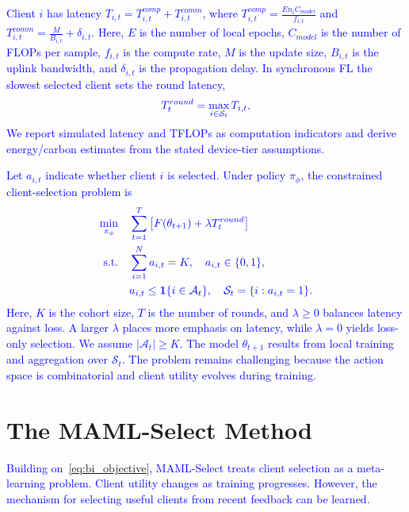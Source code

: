 \documentclass[journal]{IEEEtran}
\newcommand{\revision}[1]{\textcolor{blue}{#1}}
\begin{document}
\revision{Client $i$ has latency $T_{i,t}=T_{i,t}^{comp}+T_{i,t}^{comm}$, where $T_{i,t}^{comp} = \frac{E n_i C_{model}}{f_{i,t}}$ and $T_{i,t}^{comm} = \frac{M}{B_{i,t}} + \delta_{i,t}$. Here, $E$ is the number of local epochs, $C_{model}$ is the number of FLOPs per sample, $f_{i,t}$ is the compute rate, $M$ is the update size, $B_{i,t}$ is the uplink bandwidth, and $\delta_{i,t}$ is the propagation delay. In synchronous FL the slowest selected client sets the round latency,}
\begin{equation}
	\color{blue}
	T_t^{round} = \max_{i \in \mathcal{S}_t} T_{i,t},
	\label{eq:round_latency}
\end{equation}
\revision{We report simulated latency and TFLOPs as computation indicators and derive energy/carbon estimates from the stated device-tier assumptions.}

\revision{Let $a_{i,t}$ indicate whether client $i$ is selected. Under policy $\pi_\phi$, the constrained client-selection problem is}
\begin{equation}
	\color{blue}
	\begin{aligned}
		\min_{\pi_\phi}\quad & \sum_{t=1}^{T} \left[F(\theta_{t+1}) + \lambda T_t^{round}\right] \\
		\text{s.t.}\quad & \sum_{i=1}^{N} a_{i,t}=K,\quad a_{i,t}\in\{0,1\}, \\
		& a_{i,t}\leq \mathbf{1}\{i\in\mathcal{A}_t\},\quad
		\mathcal{S}_t=\{i:a_{i,t}=1\}.
	\end{aligned}
	\label{eq:bi_objective}
\end{equation}
\revision{Here, $K$ is the cohort size, $T$ is the number of rounds, and $\lambda \geq 0$ balances latency against loss. A larger $\lambda$ places more emphasis on latency, while $\lambda=0$ yields loss-only selection. We assume $|\mathcal{A}_t|\geq K$. The model $\theta_{t+1}$ results from local training and aggregation over $\mathcal{S}_t$. The problem remains challenging because the action space is combinatorial and client utility evolves during training.}

\section{The MAML-Select Method}
\revision{Building on~\eqref{eq:bi_objective}, MAML-Select treats client selection as a meta-learning problem. Client utility changes as training progresses. However, the mechanism for selecting useful clients from recent feedback can be learned.}
\end{document}
